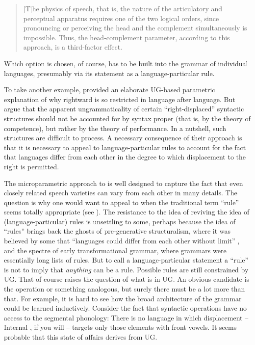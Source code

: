 \documentclass[output=paper,
modfonts
]{LSP/langsci}
\begin{document}
\begin{quote}
{[}T{]}he physics of speech, that is, the nature of the articulatory and
perceptual apparatus requires one of the two logical orders, since
pronouncing or perceiving the head and the complement simultaneously is
impossible. Thus, the head-complement parameter, according to this
approach, is a third-factor effect. \citep[4]{trotzke2013}
\end{quote}

Which option is chosen, of course, has to be built into the grammar of
individual languages, presumably via its statement as a
language-particular rule.

To take another example, \citet{kayne1994} provided an elaborate UG-based
parametric explanation of why rightward  is so restricted in
language after language. But \citet{ackema2002} argue that the
apparent ungrammaticality of certain ``right-displaced'' syntactic
structures should not be accounted for by syntax proper (that is, by the
theory of competence), but rather by the theory of performance. In a
nutshell, such structures are difficult to process. A necessary
consequence of their approach is that it is necessary to appeal to
language-particular rules to account for the fact that languages differ
from each other in the degree to which displacement to the right is
permitted.

The microparametric approach to  is well designed to capture
the fact that even closely related speech varieties can vary from each
other in many details. The question is why one would want to appeal to
 when the traditional term ``rule'' seems totally
appropriate (see ). The resistance to the idea of reviving the idea
of (language-particular) rules is unsettling to some, perhaps because
the idea of ``rules'' brings back the ghosts of pre-generative
structuralism, where it was believed by some that ``languages could
differ from each other without limit'' \citep[96]{joos1957}, and the spectre
of early transformational grammar, where grammars were essentially long
lists of rules. But to call a language-particular statement a ``rule'' is
not to imply that \emph{anything} can be a rule. Possible rules are
still constrained by UG. That of course raises the question of what is
in UG. An obvious candidate is the  operation or something
analogous, but surely there must be a lot more than that. For example,
it is hard to see how the broad architecture of the grammar could be
learned inductively. Consider the fact that syntactic operations have no
access to the segmental phonology: There is no language in which
displacement  --  Internal , if you will  --  targets only those
elements with front vowels. It seems probable that this state of affairs
derives from UG.
\end{document}
